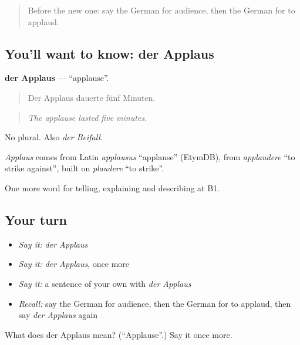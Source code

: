 \label{lesson:GE-C517-applaus}



\begin{quote}
Before the new one: say the German for audience, then the German for to applaud.
\end{quote}

\subsection*{You'll want to know: der Applaus}
\textbf{der Applaus} — \textquotedblleft{}applause\textquotedblright{}.

\begin{quote}
Der Applaus dauerte fünf Minuten.
\end{quote}

\begin{quote}
\emph{The applause lasted five minutes.}
\end{quote}

No plural. Also \emph{der Beifall}.

\begin{cousinweb}
\emph{Applaus} comes from Latin \emph{applausus} \textquotedblleft{}applause\textquotedblright{} (EtymDB), from \emph{applaudere} \textquotedblleft{}to strike against\textquotedblright{}, built on \emph{plaudere} \textquotedblleft{}to strike\textquotedblright{}.
\end{cousinweb}

\begin{grammarlens}[title={What you've built}]
One more word for telling, explaining and describing at B1.
\end{grammarlens}

\subsection*{Your turn}
\begin{itemize}
\raggedright
  \item \emph{Say it:} \emph{der Applaus}
  \item \emph{Say it:} \emph{der Applaus}, once more
  \item \emph{Say it:} a sentence of your own with \emph{der Applaus}
  \item \emph{Recall:} say the German for audience, then the German for to applaud, then say \emph{der Applaus} again
\end{itemize}

\begin{tcolorbox}[breakable,colback=teal!4,colframe=teal!35!black,title={Before you move on}]
What does der Applaus mean? (\textquotedblleft{}Applause\textquotedblright{}.) Say it once more.
\end{tcolorbox}
